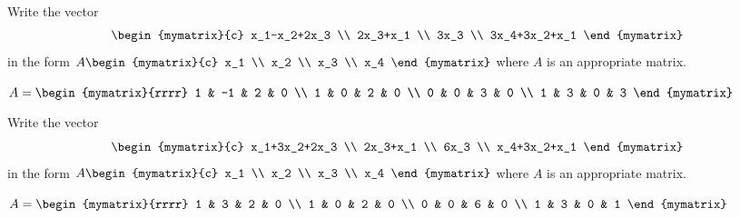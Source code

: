 \begin{ex} Write the vector
  \begin{equation*}
    \begin{mymatrix}{c}
      x_1-x_2+2x_3 \\
      2x_3+x_1 \\
      3x_3 \\
      3x_4+3x_2+x_1
    \end{mymatrix}
  \end{equation*}
  in the form $A\begin{mymatrix}{c}
    x_1 \\
    x_2 \\
    x_3 \\
    x_4
  \end{mymatrix} $ where $A$ is an appropriate matrix.
  \begin{sol}
    $A=\begin{mymatrix}{rrrr}
      1 & -1 & 2 & 0 \\
      1 & 0 & 2 & 0 \\
      0 & 0 & 3 & 0 \\
      1 & 3 & 0 & 3
    \end{mymatrix} $
  \end{sol}
\end{ex}

\begin{ex} Write the vector
  \begin{equation*}
    \begin{mymatrix}{c}
      x_1+3x_2+2x_3 \\
      2x_3+x_1 \\
      6x_3 \\
      x_4+3x_2+x_1
    \end{mymatrix}
  \end{equation*}
  in the form $A\begin{mymatrix}{c}
    x_1 \\
    x_2 \\
    x_3 \\
    x_4
  \end{mymatrix} $ where $A$ is an appropriate matrix.
  \begin{sol}
    $A=\begin{mymatrix}{rrrr}
      1 & 3 & 2 & 0 \\
      1 & 0 & 2 & 0 \\
      0 & 0 & 6 & 0 \\
      1 & 3 & 0 & 1
    \end{mymatrix}$
  \end{sol}
\end{ex}

